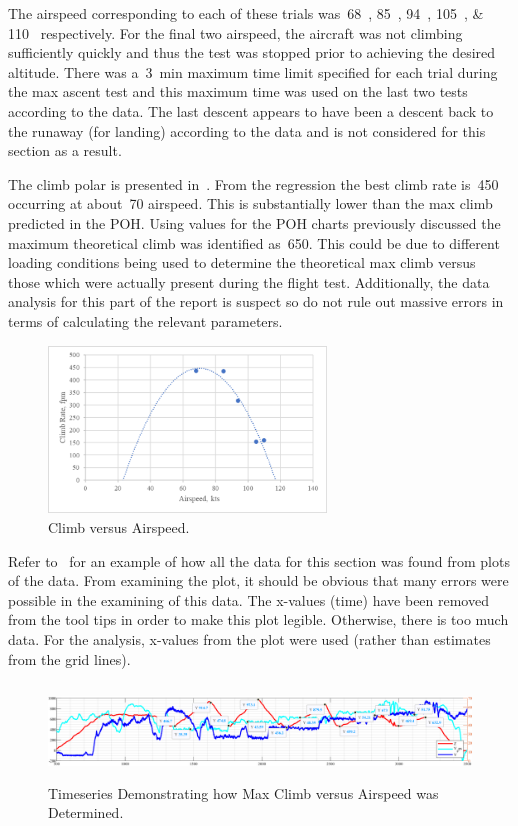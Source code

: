 \documentclass[conf]{new-aiaa}
\begin{document}
The airspeed corresponding to each of these trials was~\SIlist{68;85;94;105;110}{\kts} respectively. For the final two airspeed, the aircraft was not climbing sufficiently quickly and thus the test was stopped prior to achieving the desired altitude. There was a~\SI{3}{\minute} maximum time limit specified for each trial during the max ascent test and this maximum time was used on the last two tests according to the data. The last descent appears to have been a descent back to the runaway (for landing) according to the data and is not considered for this section as a result.

The climb polar is presented in~. From the regression the best climb rate is~\SI{450}{\fpm} occurring at about~\SI{70}{\kts} airspeed. This is substantially lower than the max climb predicted in the POH. Using values for the POH charts previously discussed the maximum theoretical climb was identified as~\SI{650}{\kts}. This could be due to different loading conditions being used to determine the theoretical max climb versus those which were actually present during the flight test. Additionally, the data analysis for this part of the report is suspect so do not rule out massive errors in terms of calculating the relevant parameters.

\begin{figure}[htp!]
\centering
	\includegraphics[height=1.75in]{ClimbPolar.png}
	\caption{Climb versus Airspeed.}
	\label{climbpolar}
\end{figure}

Refer to~ for an example of how all the data for this section was found from plots of the data. From examining the plot, it should be obvious that many errors were possible in the examining of this data. The x-values (time) have been removed from the tool tips in order to make this plot legible. Otherwise, there is too much data. For the analysis, x-values from the plot were used (rather than estimates from the grid lines).

\begin{figure}[htp!]
\centering
	\includegraphics[height=1.0in]{Climbing.png}
	\caption{Timeseries Demonstrating how Max Climb versus Airspeed was Determined.}
	\label{climbing}
\end{figure}
\end{document}
